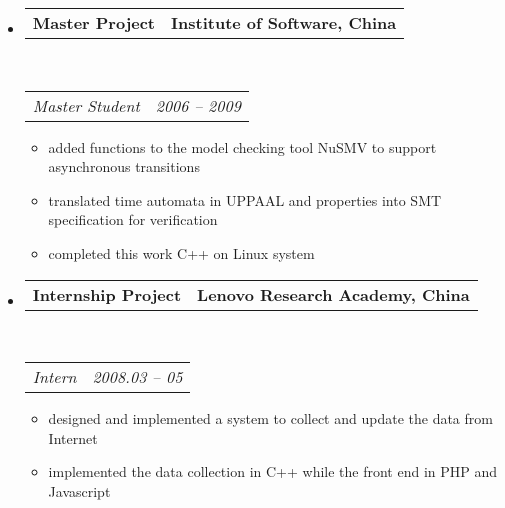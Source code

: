 \documentclass[12pt,letterpaper]{article}
\makeatletter
\newcommand{\headrows}[2]
{\begin{tabular*}{\linewidth}{l@{\extracolsep{\fill}}r}
	#1 &
	#2 \\
\end{tabular*}}
\makeatother
\begin{document}
\begin{itemize}[leftmargin=*]
	\item
    \headrows
    {\textbf{Master Project}}
    {\textbf{Institute of Software, China}}
    \\
    \headrows
    {\emph{Master Student}}
    {\emph{2006 -- 2009}}
    \begin{itemize}[label={{\Forward}}, leftmargin=1.3em]
        \setlength{\itemsep}{0.1\baselineskip}
        \item added functions to the model checking tool NuSMV to support asynchronous transitions
        \item translated time automata in UPPAAL and properties into SMT specification for verification
        \item completed this work C++ on Linux system       
    \end{itemize}
	\item
    \headrows
    {\textbf{Internship Project}}
    {\textbf{Lenovo Research Academy, China}}
    \\
    \headrows
    {\emph{Intern}}
    {\emph{2008.03 -- 05}}
    \begin{itemize}[label={{\Forward}}, leftmargin=1.3em]
        \setlength{\itemsep}{0.1\baselineskip}
        \item designed and implemented a system to collect and update the data from Internet
        \item implemented the data collection in C++ while the front end  in PHP and Javascript
    \end{itemize}
\end{itemize}
\end{document}
